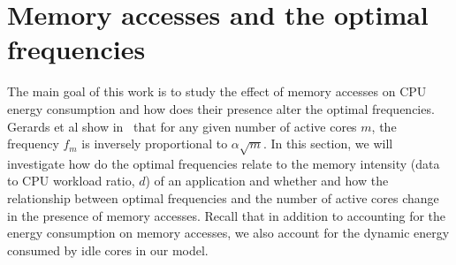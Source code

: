 \documentclass[11pt, letterpaper]{article}
\begin{document}
\section{Memory accesses and the optimal frequencies}\label{AffectMemoryAccesses}
 The main goal of this work is to study the effect of memory accesses on CPU energy consumption and how does their presence alter the optimal frequencies. 
Gerards et al show in~\cite{ConvexAndScheduling} that for any given number of active cores $m$, the frequency $f_m$ is inversely proportional to $\alpha \sqrt{m}$. In this section, we will investigate how do the optimal frequencies relate to the memory intensity (data to CPU workload ratio, $d$) of an application and whether and how the relationship between optimal frequencies and the number of active cores change in the presence of memory accesses. Recall that in addition to  accounting for the energy consumption on memory accesses, we also account for the dynamic energy consumed by idle cores in our model.
 
\end{document}
